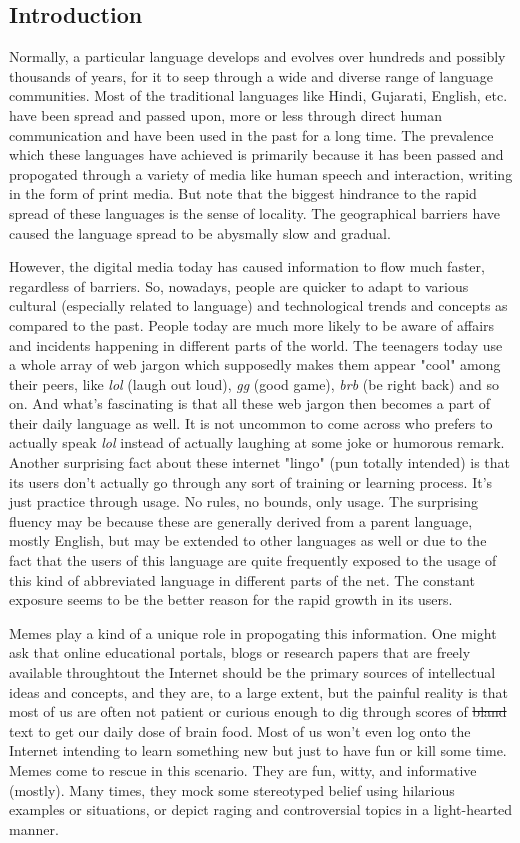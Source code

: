 \documentclass{article}
\begin{document}
\subsection{Introduction}
Normally, a particular language develops and evolves over hundreds and possibly thousands of years, for it to seep through a wide and diverse range of language communities. Most of the traditional languages like Hindi, Gujarati, English, etc. have been spread and passed upon, more or less through direct human communication and have been used in the past for a long time.  The prevalence which these languages have achieved is primarily because it has been passed and propogated through a variety of media like human speech and interaction, writing in the form of print media. But note that the biggest hindrance to the rapid spread of these languages is the sense of locality. The geographical barriers have caused the language spread to be abysmally slow and gradual.

However, the digital media today has caused information to flow much faster, regardless of barriers. So, nowadays, people are quicker to adapt to various cultural (especially related to language) and technological trends and concepts as compared to the past. People today are much more likely to be aware of affairs and incidents happening in different parts of the world. The teenagers today use a whole array of web jargon which supposedly makes them appear "cool" among their peers, like \textit{lol} (laugh out loud), \textit{gg} (good game), \textit{brb} (be right back) and so on. And what's fascinating is that all these web jargon then becomes a part of their daily language as well. It is not uncommon to come across who prefers to actually speak \textit{lol} instead of actually laughing at some joke or humorous remark. Another surprising fact about these internet "lingo" (pun totally intended) is that its users don't actually go through any sort of training or learning process. It's just practice through usage. No rules, no bounds, only usage. The surprising fluency may be because these are generally derived from a parent language, mostly English, but may be extended to other languages as well or due to the fact that the users of this language are quite frequently exposed to the usage of this kind of abbreviated language in different parts of the net. The constant exposure seems to be the better reason for the rapid growth in its users.

Memes play a kind of a unique role in propogating this information. One might ask that online educational portals, blogs or research papers that are freely available throughtout the Internet should be the primary sources of intellectual ideas and concepts, and they are, to a large extent, but the painful reality is that most of us are often not patient or curious enough to dig through scores of \st{bland} text to get our daily dose of brain food. Most of us won't even log onto the Internet intending to learn something new but just to have fun or kill some time. Memes come to rescue in this scenario. They are fun, witty, and informative (mostly). Many times, they mock some stereotyped belief using hilarious examples or situations, or depict raging and controversial topics in a light-hearted manner.
\end{document}
